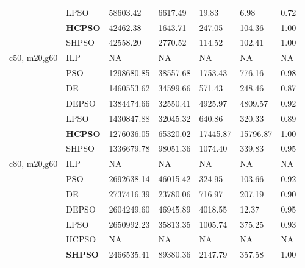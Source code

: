 \begin{table}[]
\begin{tabular}{lllllll}
 & LPSO & 58603.42 & 6617.49 & 19.83 & 6.98 & 0.72 \\
 & \textbf{HCPSO} & 42462.38 & 1643.71 & 247.05 & 104.36 & 1.00 \\
 & SHPSO & 42558.20 & 2770.52 & 114.52 & 102.41 & 1.00 \\
c50, m20,g60 & ILP & NA & NA & NA & NA & NA \\
 & PSO & 1298680.85 & 38557.68 & 1753.43 & 776.16 & 0.98 \\
 & DE & 1460553.62 & 34599.66 & 571.43 & 248.46 & 0.87 \\
 & DEPSO & 1384474.66 & 32550.41 & 4925.97 & 4809.57 & 0.92 \\
 & LPSO & 1430847.88 & 32045.32 & 640.86 & 320.33 & 0.89 \\
 & \textbf{HCPSO} & 1276036.05 & 65320.02 & 17445.87 & 15796.87 & 1.00 \\
 & SHPSO & 1336679.78 & 98051.36 & 1074.40 & 339.83 & 0.95 \\
c80, m20,g60 & ILP & NA & NA & NA & NA & NA \\
 & PSO & 2692638.14 & 46015.42 & 324.95 & 103.66 & 0.92 \\
 & DE & 2737416.39 & 23780.06 & 716.97 & 207.19 & 0.90 \\
 & DEPSO & 2604249.60 & 46945.89 & 4018.55 & 12.37 & 0.95 \\
 & LPSO & 2650992.23 & 35813.35 & 1005.74 & 375.25 & 0.93 \\
 & HCPSO & NA & NA & NA & NA & NA \\
 & \textbf{SHPSO} & 2466535.41 & 89380.36 & 2147.79 & 357.58 & 1.00
\end{tabular}
\end{table}